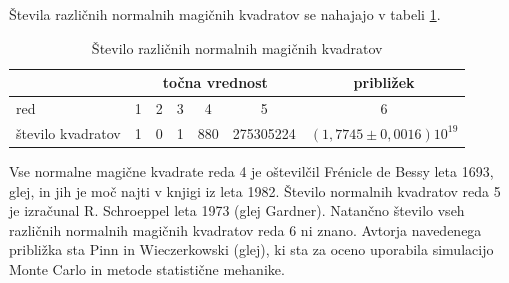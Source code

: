 \documentclass[a4paper,12pt]{article}
\theoremstyle{definition}
\theoremstyle{plain}
\begin{document}
Števila različnih normalnih magičnih kvadratov se nahajajo v tabeli \ref{table:stevila}.




\begin{table}[!ht]
   \centering
   \caption{Število različnih normalnih magičnih kvadratov}
   \label{table:stevila}
   \begin{tabular}{lcccccc}\toprule
      
            & \multicolumn{5}{c}{točna vrednost} &približek \\
            \midrule
            red &1 &2 &3 &4 &5 &6 \\
            število kvadratov &1 &0 &1 &880 &275305224 & $(1,7745\pm0,0016)10^{19}$ \\\hline
            \bottomrule
   \end{tabular}
\end{table}

Vse normalne magične kvadrate reda 4 je oštevilčil Frénicle de Bessy
leta 1693, glej\cite{bessy}, in jih je moč najti v knjigi\cite{berlekamp}
iz leta 1982. Število normalnih kvadratov reda 5 je izračunal
R. Schroeppel leta 1973 (glej Gardner\cite{gardner}).
Natančno število vseh različnih normalnih magičnih kvadratov reda 6 ni znano.
Avtorja navedenega približka sta Pinn in Wieczerkowski (glej\cite{pinn}), ki
sta za oceno uporabila simulacijo Monte Carlo in metode statistične mehanike.



\newpage




\end{document}
